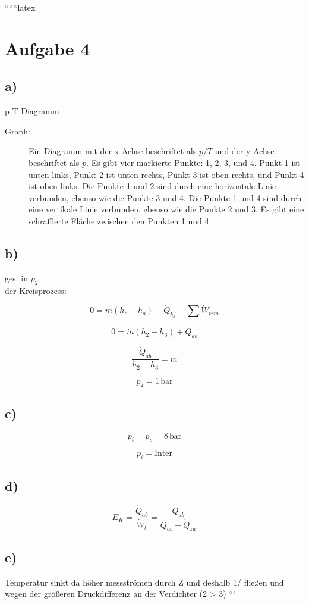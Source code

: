 
``````latex


\section*{Aufgabe 4}

\subsection*{a)}
p-T Diagramm

\begin{description}
    \item[Graph:] Ein Diagramm mit der x-Achse beschriftet als $p/T$ und der y-Achse beschriftet als $p$. Es gibt vier markierte Punkte: 1, 2, 3, und 4. Punkt 1 ist unten links, Punkt 2 ist unten rechts, Punkt 3 ist oben rechts, und Punkt 4 ist oben links. Die Punkte 1 und 2 sind durch eine horizontale Linie verbunden, ebenso wie die Punkte 3 und 4. Die Punkte 1 und 4 sind durch eine vertikale Linie verbunden, ebenso wie die Punkte 2 und 3. Es gibt eine schraffierte Fläche zwischen den Punkten 1 und 4.
\end{description}

\subsection*{b)}
ges. in $p_2$\\
der Kreisprozess:

\[
0 = \dot{m} (h_e - h_a) - \dot{Q}_{kj} - \sum \dot{W}_{trm}
\]

\[
0 = \dot{m} (h_2 - h_3) + \dot{Q}_{ab}
\]

\[
\frac{\dot{Q}_{ab}}{h_2 - h_3} = \dot{m}
\]

\[
p_2 = 1 \, \text{bar}
\]

\subsection*{c)}
\[
p_i = p_s = 8 \, \text{bar}
\]

\[
p_i = \text{Inter}
\]

\subsection*{d)}
\[
E_K = \frac{\dot{Q}_{ab}}{\dot{W}_t} = \frac{\dot{Q}_{ab}}{\dot{Q}_{ab} - \dot{Q}_{zu}}
\]

\subsection*{e)}
Temperatur sinkt da höher messströmen durch Z und deshalb 1/ fließen und wegen der größeren Druckdifferenz an der Verdichter (2 > 3)
```